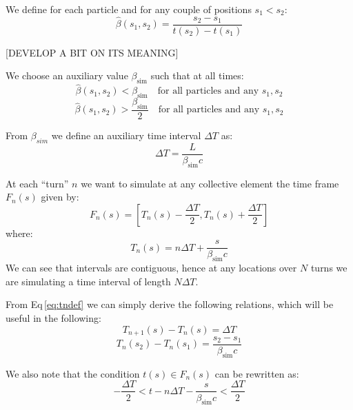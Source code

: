 We define for each particle and for any couple of positions $s_1 < s_2$:
\begin{equation}
\hat{\beta}(s_1, s_2) = \frac{s_2-s_1}{t(s_2) - t(s_1)}
\end{equation}

[DEVELOP A BIT ON ITS MEANING]

We choose an auxiliary value $\beta_\text{sim}$ such that at all times:
\begin{equation}
\hat{\beta}(s_1, s_2) < \beta_\text{sim} \quad \text{for all particles and any } s_1, s_2
\label{eq:betasim1}
\end{equation}
\begin{equation}
\hat{\beta}(s_1, s_2) > \frac{\beta_\text{sim}}{2}\quad \text{for all particles and any } s_1, s_2
\label{eq:betasim2}
\end{equation}

From $\beta_{sim}$ we define an auxiliary time interval $\Delta T$ as:
\begin{equation}
\Delta T = \frac{L}{\beta_\text{sim}c}
\label{eq:deltatdef}
\end{equation}


At each ``turn'' $n$ we want to simulate at any  collective element the time frame $F_n(s) $ given by:
\begin{equation}
F_n(s) = \left[ T_n(s) - \frac{\Delta T}{2}, T_n(s) + \frac{\Delta T}{2} \right]
\label{eq:framedef}
\end{equation}
where:
\begin{equation}
T_n(s) = n \Delta T + \frac{s}{\beta_\text{sim} c}
\label{eq:tndef}
\end{equation}
We can see that intervals are contiguous, hence at any locations over $N$ turns we are simulating a time interval of length $N \Delta T$.

From Eq\,\ref{eq:tndef} we can simply derive the following  relations, which will be useful in the following:
\begin{equation}
T_{n+1}(s) - T_{n}(s)  = \Delta T
\label{eq:tniter}
\end{equation}
\begin{equation}
T_{n}(s_2) - T_{n}(s_1)  = \frac{s_2 - s_1}{\beta_\text{sim} c}
\label{eq:frametransport}
\end{equation}

We also note that the condition $t(s) \in F_n(s)$ can be rewritten as:
\begin{equation}
- \frac{\Delta T}{2} < t - n \Delta T - \frac{s}{\beta_\text{sim} c} < \frac{\Delta T}{2}
\label{eq:frameineq}
\end{equation}


